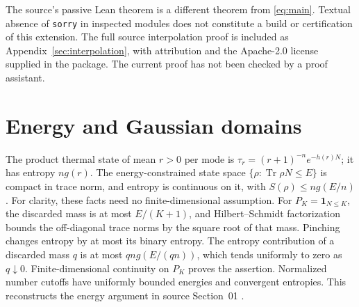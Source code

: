 \documentclass[11pt]{article}
\newcommand{\Tr}{\operatorname{Tr}}
\theoremstyle{remark}\newtheorem{remark}[theorem]{Remark}
\begin{document}
The source's passive Lean theorem is a different theorem from
\eqref{eq:main}. Textual absence of \texttt{sorry} in inspected modules
does not constitute a build or certification of this extension.
The full source interpolation proof is included as Appendix~\ref{sec:interpolation},
with attribution and the Apache-2.0 license supplied in the package.
The current proof has not been checked by a proof assistant.

\section{Energy and Gaussian domains}
The product thermal state of mean $r>0$ per mode is
$\tau_r=(r+1)^{-n}e^{-h(r)N}$; it has entropy $ng(r)$.
The energy-constrained state space $\{\rho:\Tr\rho N\le E\}$ is compact
in trace norm, and entropy is continuous on it, with
$S(\rho)\le ng(E/n)$.
For clarity, these facts need no finite-dimensional assumption.
For $P_K=\mathbf1_{N\le K}$, the discarded mass is at most $E/(K+1)$,
and Hilbert--Schmidt factorization bounds the off-diagonal trace norms by
the square root of that mass. Pinching changes entropy by at most its
binary entropy. The entropy contribution of a discarded mass $q$ is at
most $qn g(E/(qn))$, which tends uniformly to zero as $q\downarrow0$.
Finite-dimensional continuity on $P_K$ proves the assertion. Normalized
number cutoffs have uniformly bounded energies and convergent entropies.
This reconstructs the energy argument in source Section~01 \cite{OAI}.
\end{document}
